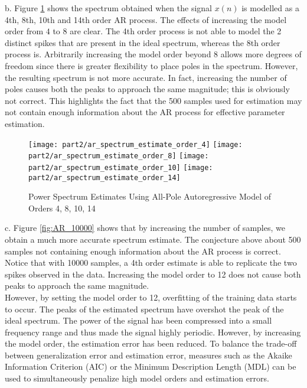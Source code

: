 \noindent{}b. Figure \ref{fig:AR_1000} shows the spectrum obtained when the signal $x(n)$ is modelled as a 4th, 8th, 10th and 14th order AR process. The effects of increasing the model order from $4$ to $8$ are clear. The 4th order process is not able to model the 2 distinct spikes that are present in the ideal spectrum, whereas the 8th order process is. Arbitrarily increasing the model order beyond 8 allows more degrees of freedom since there is greater flexibility to place poles in the spectrum. However, the resulting spectrum is not more accurate. In fact, increasing the number of poles causes both the peaks to approach the same magnitude; this is obviously not correct. This highlights the fact that the 500 samples used for estimation may not contain enough information about the AR process for effective parameter estimation.

\begin{figure}[H]
\centering{}
\texttt{[image: part2/ar\_spectrum\_estimate\_order\_4]}
\texttt{[image: part2/ar\_spectrum\_estimate\_order\_8]}
\texttt{[image: part2/ar\_spectrum\_estimate\_order\_10]}
\texttt{[image: part2/ar\_spectrum\_estimate\_order\_14]}
\caption{Power Spectrum Estimates Using All-Pole Autoregressive Model of Orders 4, 8, 10, 14}
\label{fig:AR_1000}
\end{figure}

\noindent{}c. Figure \ref{fig:AR_10000} shows that by increasing the number of samples, we obtain a much more accurate spectrum estimate. The conjecture above about 500 samples not containing enough information about the AR process is correct. Notice that with 10000 samples, a 4th order estimate is able to replicate the two spikes observed in the data. Increasing the model order to 12 does not cause both peaks to approach the same magnitude. \\

\noindent{}However, by setting the model order to 12, overfitting of the training data starts to occur. The peaks of the estimated spectrum have overshot the peak of the ideal spectrum. The power of the signal has been compressed into a small frequency range and thus made the signal highly periodic. However, by increasing the model order, the estimation error has been reduced. To balance the trade-off between generalization error and estimation error, measures such as the Akaike Information Criterion (AIC) or the Minimum Description Length (MDL) can be used to simultaneously penalize high model orders and estimation errors. 

